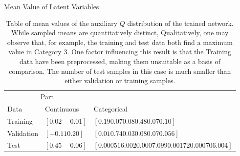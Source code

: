 \documentclass{article}
\begin{document}
\begin{table}[t]
  \caption{Mean Value of Latent Variables}
  \label{sample-table}
  \begin{tabular}{lll}
    \toprule
    \multicolumn{2}{c}{Part}                   \\
    \cmidrule{1-2}
    Data       & Continuous      & Categorical \\
    \midrule
    Training   & $[ 0.02 -0.01]$ &$[ 0.19  0.07  0.08  0.48  0.07  0.10 ]$ \\
    Validation & $[-0.11  0.20]$ & $[ 0.01  0.74  0.03  0.08  0.07  0.056]$     \\
    Test       & $[ 0.45 -0.06]$       & $[  0.000516   .002   0.0007   .099 0.00172   0.000706 .004]$  \\
    \bottomrule
  \end{tabular}
  \caption{Table of mean values of the auxiliary $Q$ distribution of the trained network. While sampled means are quantitatively distinct, Qualitatively, one may observe that, for example, the training and test data both find a maximum value in Category 3.  One factor influencing this result is that the Training data have been preprocessed, making them unsuitable as a basis of comparison.  The number of test samples in this case is much smaller than either validation or training samples.}
\end{table}

\end{document}
